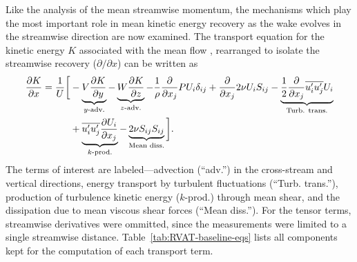 Like the analysis of the mean streamwise momentum, the mechanisms which play the
most important role in mean kinetic energy recovery as the wake evolves in the
streamwise direction are now examined. The transport equation for the kinetic
energy $K$ associated with the mean flow \cite{TennekesAndLumley}, rearranged to
isolate the streamwise recovery ($\partial / \partial x$) can be written as
\begin{equation}
    \begin{split}
        \frac{\partial K}{\partial x}
        =
        \frac{1}{U}
        \bigg{[}
        & - \underbrace{V \frac{\partial K}{\partial y}}_{y\text{-adv.}}
        - \underbrace{W \frac{\partial K}{\partial z}}_{z\text{-adv.}}
        - \frac{1}{\rho}\frac{\partial}{\partial x_j} P U_i \delta_{ij}
        + \frac{\partial}{\partial x_j} 2 \nu U_i S_{ij}
        - \underbrace{
            \frac{1}{2}\frac{\partial}{\partial x_j} \overline{u_i' u_j'} U_i
        }_{\text{Turb. trans.}} \\
        & +
        \underbrace{
            \overline{u_i' u_j'} \frac{\partial U_i}{\partial x_j}
        }_{k\text{-prod.}}
        -
        \underbrace{
            2 \nu S_{ij}S_{ij}
        }_{\text{Mean diss.}}
        \bigg{]}.
    \label{eq:K-full}
    \end{split}
\end{equation}
The terms of interest are labeled---advection (``adv.'') in the cross-stream and
vertical directions, energy transport by turbulent fluctuations (``Turb.
trans.''), production of turbulence kinetic energy ($k$-prod.) through mean
shear, and the dissipation due to mean viscous shear forces (``Mean diss.'').
For the tensor terms, streamwise derivatives were ommitted, since the
measurements were limited to a single streamwise distance.
Table~\ref{tab:RVAT-baseline-eqs} lists all components kept for the computation
of each transport term.

